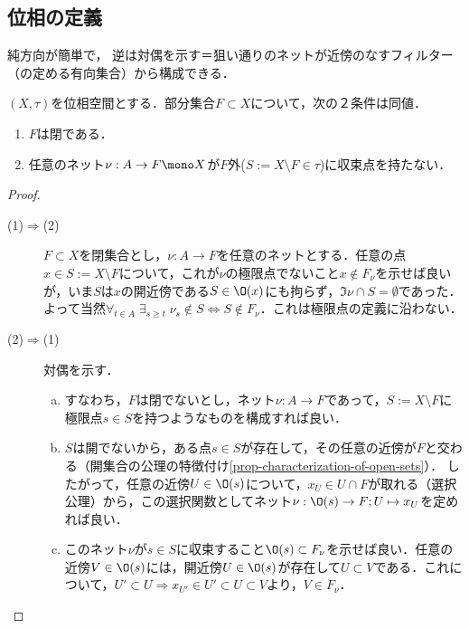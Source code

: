 \documentclass[uplatex,dvipdfmx]{jsreport}
\begin{document}
\subsection{位相の定義}

\begin{tcolorbox}[colframe=ForestGreen, colback=ForestGreen!10!white,breakable,colbacktitle=ForestGreen!40!white,coltitle=black,fonttitle=\bfseries\sffamily,
title=]
    純方向が簡単で，
    逆は対偶を示す＝狙い通りのネットが近傍のなすフィルター（の定める有向集合）から構成できる．
\end{tcolorbox}

\begin{proposition}[閉集合の特徴付け (AC)]\label{prop-characterization-of-open-sets-in-terms-of-net}
    $(X,\tau)$を位相空間とする．部分集合$F\subset X$について，次の２条件は同値．
    \begin{enumerate}
        \item $F$は閉である．
        \item 任意のネット$\nu:A\to F\mono X$が$F$外($S:=X\setminus F\in\tau$)に収束点を持たない．
    \end{enumerate}
\end{proposition}
\begin{proof}\mbox{}
    \begin{description}
        \item[(1)$\Rightarrow$(2)] $F\subset X$を閉集合とし，$\nu:A\to F$を任意のネットとする．任意の点$x\in S:=X\setminus F$について，これが$\nu$の極限点でないこと$x\notin F_\nu$を示せば良いが，いま$S$は$x$の開近傍である$S\in\O(x)$にも拘らず，$\Im\nu\cap S=\emptyset$であった．よって当然$\forall_{t\in A}\;\exists_{s\ge t}\;\nu_s\notin S\Leftrightarrow S\notin F_\nu$．これは極限点の定義に沿わない．
        \item[(2)$\Rightarrow$(1)] 対偶を示す．
        \begin{enumerate}[(a)]
            \item すなわち，$F$は閉でないとし，ネット$\nu:A\to F$であって，$S:=X\setminus F$に極限点$s\in S$を持つようなものを構成すれば良い．
            \item $S$は開でないから，ある点$s\in S$が存在して，その任意の近傍が$F$と交わる（開集合の公理の特徴付け\ref{prop-characterization-of-open-sets}）．
            したがって，任意の近傍$U\in\O(s)$について，$x_U\in U\cap F$が取れる（選択公理）から，この選択関数としてネット$\nu:\O(s)\to F;U\mapsto x_U$を定めれば良い．
            \item このネット$\nu$が$s\in S$に収束すること$\O(s)\subset F_\nu$を示せば良い．任意の近傍$V\in\O(s)$には，開近傍$U\in\O(s)$が存在して$U\subset V$である．これについて，$U'\subset U\Rightarrow x_{U'}\in U'\subset U\subset V$より，$V\in F_\nu$．
        \end{enumerate}
    \end{description}
\end{proof}
\end{document}
